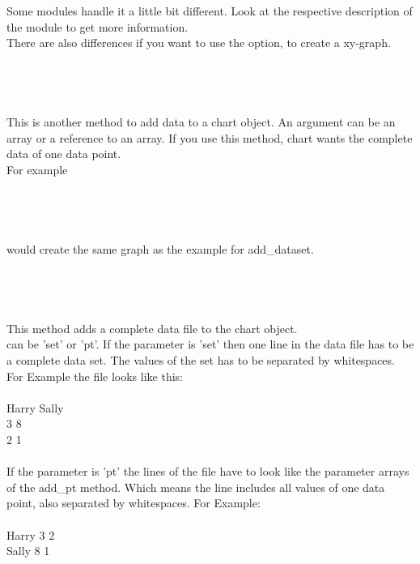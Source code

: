 Some modules handle it a little bit different. Look at the respective description of the module to get more information.\\
There are also differences if you want to use the  option, to create a xy-graph. \\
\\
\\
 \\ \\
This is another method to add data to a chart object. An argument can be an array or a reference to an array. If you use this method, chart wants the complete data of one data point.\\
For example\\
\\
\\ 
\\
\\
would create the same graph as the example for add\_dataset.\\
\\
\\
 \\
 \\
This method adds a complete data file to the chart object.\\
 can be 'set' or 'pt'. If the parameter is 'set' then one line in the data file has to be a complete data set. The values of the set has to be separated by whitespaces. For Example the file looks like this:\\
\\
Harry  Sally\\
3      8\\
2      1\\
\\
If the parameter is 'pt' the lines of the file have to look like the parameter arrays of the add\_pt method. Which means the line includes all values of one data point, also separated by whitespaces. For Example:\\
\\
Harry 3 2\\
Sally 8 1\\
\\
\\
 \\
